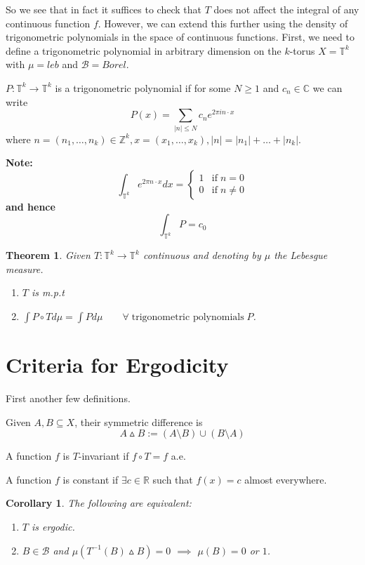 \documentclass[11pt]{article}
\newcommand{\defeq}{:=}
\newcommand{\abs}[1]{\left|#1\right|}
\newcommand{\symd}{\vartriangle}
\newcommand{\ktor}{\mathbb{T}^k}
\newcommand{\R}{\mathbb{R}}
\newcommand{\C}{\mathbb{C}}
\newcommand{\Z}{\mathbb{Z}}
\newenvironment{defin}
	{\begin{mdframed}[backgroundcolor=white, roundcorner=5pt, linewidth=1pt, linecolor=RoyalBlue]}
	{\end{mdframed}}
\newcommand{\mdf}[1]{{\color{RoyalBlue} #1}}
\newenvironment{note}
	{\begin{mdframed}[backgroundcolor=white, linecolor=RubineRed, roundcorner=5pt, linewidth=1pt]\bfseries{Note:}\normalfont}
	{\end{mdframed}}
\newtheorem{theorem}[prop]{Theorem}
\newtheorem{cor}[prop]{Corollary}
\begin{document}
So we see that in fact it suffices to check that $T$ does not affect the integral of any continuous function $f$.
However, we can extend this further using the density of trigonometric polynomials in the space of continuous functions. 
First, we need to define a trigonometric polynomial in arbitrary dimension on the $k$-torus $X=\ktor$ with $\mu=leb$ and $\mathcal{B}=Borel$.
\begin{defin}
	$P:\ktor\to\ktor$ is a \mdf{trigonometric polynomial} if for some $N\geq 1$ and $c_n\in\C$ we can write
	$$P(x)=\sum_{\abs{n}\leq N} c_n e^{2\pi in\cdot x}$$
	where $n=(n_1,\dots,n_k)\in\Z^k, x=(x_1,\dots,x_k), \abs{n}=\abs{n_1}+\dots+\abs{n_k}$.
\end{defin}
\begin{note}
	\[
		\int_{\ktor} e^{2\pi n\cdot x} dx =
		\begin{cases}
			1 & \text{if} \; n=0\\
			0 & \text{if} \; n\neq 0
		\end{cases}
	\]
	and hence
	$$\int_{\ktor}P = c_0$$
\end{note}

\begin{theorem}
Given $T:\ktor\to \ktor$ continuous and denoting by $\mu$ the Lebesgue measure.
\begin{enumerate}
	\item $T$ is m.p.t
	\item $\int P\circ T d\mu = \int P d\mu \quad\quad \forall\; \text{trigonometric polynomials}\; P$. 
\end{enumerate}
\end{theorem}

\section{Criteria for Ergodicity}
First another few definitions.
\begin{defin}
Given $A,B\subseteq X$, their \mdf{symmetric difference} is
$$A\symd B\defeq (A \setminus B)\cup (B \setminus A)$$

A function $f$ is \mdf{$T$-invariant} if $f \circ T = f$ a.e.

A function $f$ is \mdf{constant} if $\exists c\in\R$ such that $f(x) = c$ almost everywhere.
\end{defin}

\begin{cor}
The following are equivalent:
\begin{enumerate}
	\item $T$ is ergodic.
	\item $B\in \mathcal{B}$ and $\mu(T^{-1}(B) \symd B) = 0$ $\implies$ $\mu(B) = 0 $ or $1$.
\end{enumerate}
\end{cor}
\end{document}
